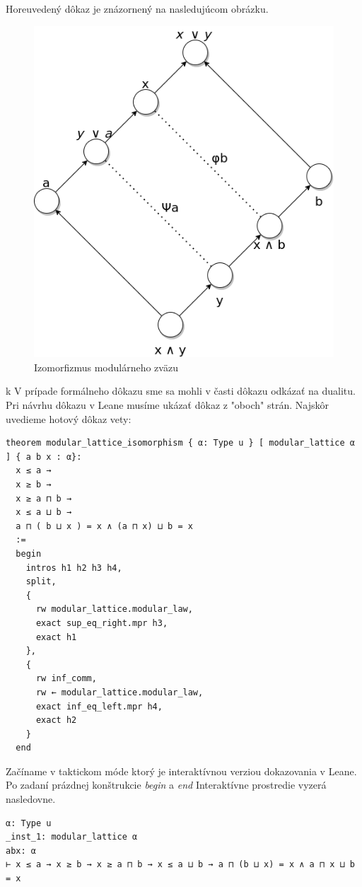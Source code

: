 \documentclass[a4paper,10pt,oneside]{report}%
\begin{document}
    Horeuvedený dôkaz je znázornený na nasledujúcom obrázku.

\begin{figure}[!ht]
    \centering
    \includegraphics[scale=0.35]{modular_lattice_isomorphism.png}
    \caption{Izomorfizmus modulárneho zväzu}
\end{figure}
k
    V prípade formálneho dôkazu sme sa mohli v časti dôkazu odkázať na dualitu.
    Pri návrhu dôkazu v Leane musíme ukázať dôkaz z "oboch" strán. Najskôr uvedieme
hotový dôkaz vety:
\begin{lstlisting}
theorem modular_lattice_isomorphism { α: Type u } [ modular_lattice α ] { a b x : α}:
  x ≤ a →
  x ≥ b →
  x ≥ a ⊓ b →
  x ≤ a ⊔ b →
  a ⊓ ( b ⊔ x ) = x ∧ (a ⊓ x) ⊔ b = x
  :=
  begin
    intros h1 h2 h3 h4,
    split,
    {
      rw modular_lattice.modular_law,
      exact sup_eq_right.mpr h3,
      exact h1
    },
    {
      rw inf_comm,
      rw ← modular_lattice.modular_law,
      exact inf_eq_left.mpr h4,
      exact h2
    }
  end
\end{lstlisting}
    Začíname v taktickom móde ktorý je interaktívnou verziou dokazovania v Leane.
    Po zadaní prázdnej konštrukcie \emph{begin} a \emph{end}
    Interaktívne prostredie vyzerá nasledovne.
\begin{lstlisting}
α: Type u
_inst_1: modular_lattice α
abx: α
⊢ x ≤ a → x ≥ b → x ≥ a ⊓ b → x ≤ a ⊔ b → a ⊓ (b ⊔ x) = x ∧ a ⊓ x ⊔ b = x
\end{lstlisting}
\end{document}

